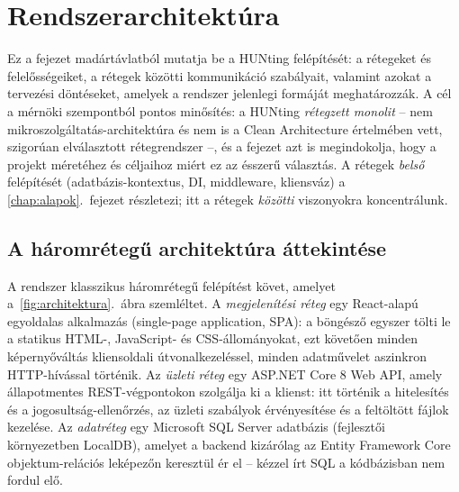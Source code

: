 
\chapter{Rendszerarchitektúra}
\label{chap:architektura}

Ez a fejezet madártávlatból mutatja be a HUNting felépítését: a rétegeket és felelősségeiket, a
rétegek közötti kommunikáció szabályait, valamint azokat a tervezési döntéseket, amelyek a
rendszer jelenlegi formáját meghatározzák. A cél a mérnöki szempontból pontos minősítés: a
HUNting \emph{rétegzett monolit} -- nem mikroszolgáltatás-architektúra és nem is a Clean
Architecture értelmében vett, szigorúan elválasztott rétegrendszer --, és a fejezet azt is
megindokolja, hogy a projekt méretéhez és céljaihoz miért ez az ésszerű választás. A rétegek
\emph{belső} felépítését (adatbázis-kontextus, DI, middleware, kliensváz) a
\ref{chap:alapok}.~fejezet részletezi; itt a rétegek \emph{közötti} viszonyokra koncentrálunk.

\section{A háromrétegű architektúra áttekintése}
\label{sec:arch-attekintes}

A rendszer klasszikus háromrétegű felépítést követ, amelyet
a~\ref{fig:architektura}.~ábra szemléltet. A \emph{megjelenítési réteg} egy React-alapú
egyoldalas alkalmazás (single-page application, SPA): a böngésző egyszer tölti le a statikus
HTML-, JavaScript- és CSS-állományokat, ezt követően minden képernyőváltás kliensoldali
útvonalkezeléssel, minden adatművelet aszinkron HTTP-hívással történik. Az \emph{üzleti réteg}
egy ASP.NET Core 8 Web API, amely állapotmentes REST-végpontokon szolgálja ki a klienst: itt
történik a hitelesítés és a jogosultság-ellenőrzés, az üzleti szabályok érvényesítése és a
feltöltött fájlok kezelése. Az \emph{adatréteg} egy Microsoft SQL Server adatbázis (fejlesztői
környezetben LocalDB), amelyet a backend kizárólag az Entity Framework Core objektum-relációs
leképezőn keresztül ér el -- kézzel írt SQL a kódbázisban nem fordul elő.

